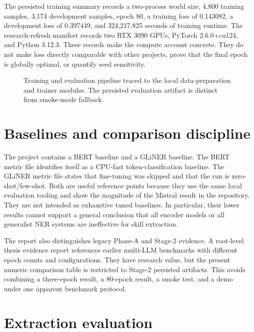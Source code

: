 

The persisted training summary records a two-process world size, 4,800 training samples, 3,174 development samples, epoch 80, a training loss of 0.143082, a development loss of 0.397449, and 324,217.825 seconds of training runtime. The research-refresh manifest records two RTX 3090 GPUs, PyTorch 2.6.0+cu124, and Python 3.12.3. These records make the compute account concrete. They do not make loss directly comparable with other projects, prove that the final epoch is globally optimal, or quantify seed sensitivity.

\begin{figure}[H]
\centering

\caption{Training and evaluation pipeline traced to the local data-preparation and trainer modules. The persisted evaluation artifact is distinct from smoke-mode fallback.}
\label{fig:training}
\end{figure}

\section{Baselines and comparison discipline}

The project contains a BERT baseline and a GLiNER baseline. The BERT metric file identifies itself as a CPU-fast token-classification baseline. The GLiNER metric file states that fine-tuning was skipped and that the run is zero-shot/few-shot. Both are useful reference points because they use the same local evaluation tooling and show the magnitude of the Mistral result in the repository. They are not intended as exhaustive tuned baselines. In particular, their lower results cannot support a general conclusion that all encoder models or all generalist NER systems are ineffective for skill extraction.

The report also distinguishes legacy Phase-A and Stage-2 evidence. A root-level thesis evidence report references earlier multi-LLM benchmarks with different epoch counts and configurations. They have research value, but the present numeric comparison table is restricted to Stage-2 persisted artifacts. This avoids combining a three-epoch result, a 80-epoch result, a smoke test, and a demo under one apparent benchmark protocol.

\section{Extraction evaluation}

